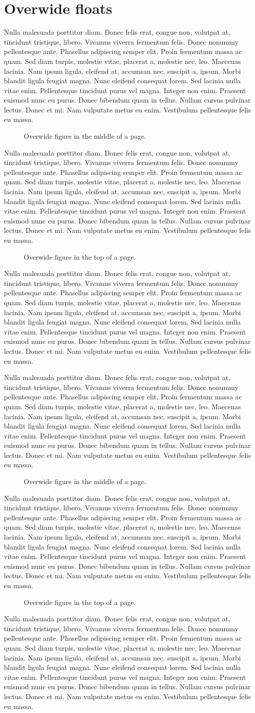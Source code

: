 \documentclass[draft*,nochapters]{aaltoseries}
\newcommand{\lipsum}{%
Nulla malesuada porttitor diam. Donec felis erat, congue non, volutpat at, tincidunt tristique, libero. Vivamus viverra fermentum felis. Donec nonummy pellentesque ante. Phasellus adipiscing semper elit. Proin fermentum massa ac quam. Sed diam turpis, molestie vitae, placerat a, molestie nec, leo. Maecenas lacinia. Nam ipsum ligula, eleifend at, accumsan nec, suscipit a, ipsum. Morbi blandit ligula feugiat magna. Nunc eleifend consequat lorem. Sed lacinia nulla vitae enim. Pellentesque tincidunt purus vel magna. Integer non enim. Praesent euismod nunc eu purus. Donec bibendum quam in tellus. Nullam cursus pulvinar lectus. Donec et mi. Nam vulputate metus eu enim. Vestibulum pellentesque felis eu massa.
}
\begin{document}
\section{Overwide floats}

\lipsum

\begin{figure}[h]
\widefigureshift[1]%
\caption{Overwide figure in the middle of a page.}
\end{figure}

\noindent\lipsum

\begin{figure}[t]
\widefigureshift[1]%
\caption{Overwide figure in the top of a page.}
\end{figure}

\lipsum

\lipsum

\begin{figure}[h]
\widefigureshift[1]%
\caption{Overwide figure in the middle of a page.}
\end{figure}

\noindent\lipsum

\begin{figure}[t]
\widefigureshift[1]%
\caption{Overwide figure in the top of a page.}
\end{figure}

\lipsum

\nocite{*}


\end{document}
